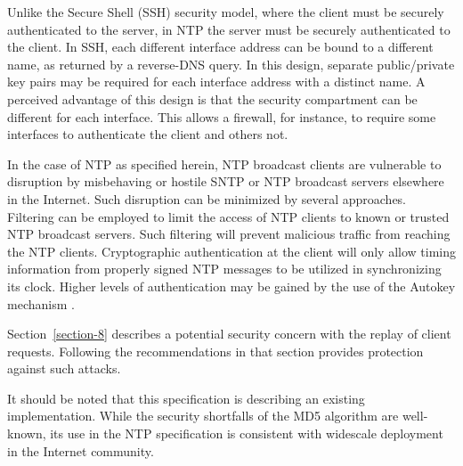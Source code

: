 Unlike the Secure Shell (SSH) security model, where the client must
be securely authenticated to the server, in NTP the server must be
securely authenticated to the client. In SSH, each different
interface address can be bound to a different name, as returned by a
reverse-DNS query. In this design, separate public/private key pairs
may be required for each interface address with a distinct name. A
perceived advantage of this design is that the security compartment
can be different for each interface. This allows a firewall, for
instance, to require some interfaces to authenticate the client and
others not.

In the case of NTP as specified herein, NTP broadcast clients are
vulnerable to disruption by misbehaving or hostile SNTP or NTP
broadcast servers elsewhere in the Internet. Such disruption can be
minimized by several approaches. Filtering can be employed to limit
the access of NTP clients to known or trusted NTP broadcast servers.
Such filtering will prevent malicious traffic from reaching the NTP
clients. Cryptographic authentication at the client will only allow
timing information from properly signed NTP messages to be utilized
in synchronizing its clock. Higher levels of authentication may be
gained by the use of the Autokey mechanism \cite{RFC5906}.

Section~\ref{section-8} describes a potential security concern with the replay of
client requests. Following the recommendations in that section
provides protection against such attacks.

It should be noted that this specification is describing an existing
implementation. While the security shortfalls of the MD5 algorithm
are well-known, its use in the NTP specification is consistent with
widescale deployment in the Internet community.
